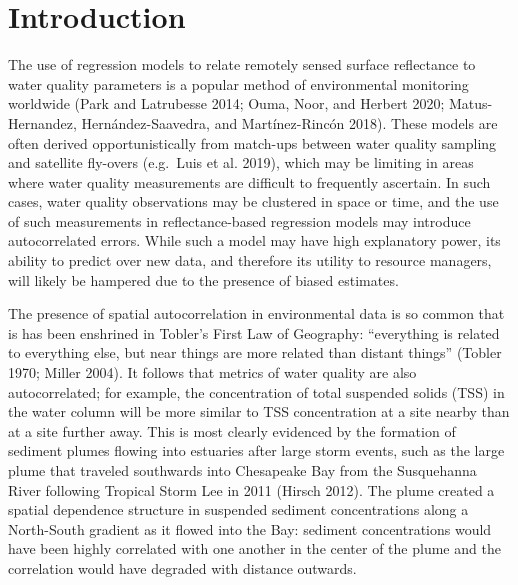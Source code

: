 \documentclass[11pt,]{article}
\begin{document}
\vskip -8.5pt



\noindent  

\linespread{1.25}

\hypertarget{introduction}{%
\section{Introduction}\label{introduction}}

The use of regression models to relate remotely sensed surface
reflectance to water quality parameters is a popular method of
environmental monitoring worldwide (Park and Latrubesse 2014; Ouma,
Noor, and Herbert 2020; Matus-Hernandez, Hernández-Saavedra, and
Martínez-Rincón 2018). These models are often derived opportunistically
from match-ups between water quality sampling and satellite fly-overs
(e.g.~Luis et al. 2019), which may be limiting in areas where water
quality measurements are difficult to frequently ascertain. In such
cases, water quality observations may be clustered in space or time, and
the use of such measurements in reflectance-based regression models may
introduce autocorrelated errors. While such a model may have high
explanatory power, its ability to predict over new data, and therefore
its utility to resource managers, will likely be hampered due to the
presence of biased estimates.

The presence of spatial autocorrelation in environmental data is so
common that is has been enshrined in Tobler's First Law of Geography:
``everything is related to everything else, but near things are more
related than distant things'' (Tobler 1970; Miller 2004). It follows
that metrics of water quality are also autocorrelated; for example, the
concentration of total suspended solids (TSS) in the water column will
be more similar to TSS concentration at a site nearby than at a site
further away. This is most clearly evidenced by the formation of
sediment plumes flowing into estuaries after large storm events, such as
the large plume that traveled southwards into Chesapeake Bay from the
Susquehanna River following Tropical Storm Lee in 2011 (Hirsch 2012).
The plume created a spatial dependence structure in suspended sediment
concentrations along a North-South gradient as it flowed into the Bay:
sediment concentrations would have been highly correlated with one
another in the center of the plume and the correlation would have
degraded with distance outwards.
\end{document}
